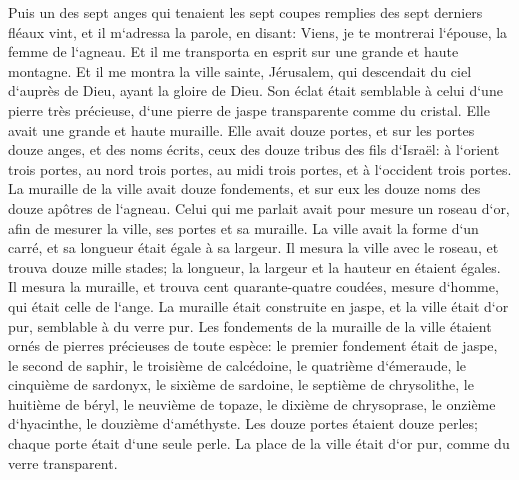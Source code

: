 \verse Puis un des sept anges qui tenaient les sept coupes remplies des sept derniers fléaux vint, et il m`adressa la parole, en disant: Viens, je te montrerai l`épouse, la femme de l`agneau. 
\verse Et il me transporta en esprit sur une grande et haute montagne. Et il me montra la ville sainte, Jérusalem, qui descendait du ciel d`auprès de Dieu, ayant la gloire de Dieu. 
\verse Son éclat était semblable à celui d`une pierre très précieuse, d`une pierre de jaspe transparente comme du cristal. 
\verse Elle avait une grande et haute muraille. Elle avait douze portes, et sur les portes douze anges, et des noms écrits, ceux des douze tribus des fils d`Israël: 
\verse à l`orient trois portes, au nord trois portes, au midi trois portes, et à l`occident trois portes. 
\verse La muraille de la ville avait douze fondements, et sur eux les douze noms des douze apôtres de l`agneau. 
\verse Celui qui me parlait avait pour mesure un roseau d`or, afin de mesurer la ville, ses portes et sa muraille. 
\verse La ville avait la forme d`un carré, et sa longueur était égale à sa largeur. Il mesura la ville avec le roseau, et trouva douze mille stades; la longueur, la largeur et la hauteur en étaient égales. 
\verse Il mesura la muraille, et trouva cent quarante-quatre coudées, mesure d`homme, qui était celle de l`ange. 
\verse La muraille était construite en jaspe, et la ville était d`or pur, semblable à du verre pur. 
\verse Les fondements de la muraille de la ville étaient ornés de pierres précieuses de toute espèce: le premier fondement était de jaspe, le second de saphir, le troisième de calcédoine, le quatrième d`émeraude, 
\verse le cinquième de sardonyx, le sixième de sardoine, le septième de chrysolithe, le huitième de béryl, le neuvième de topaze, le dixième de chrysoprase, le onzième d`hyacinthe, le douzième d`améthyste. 
\verse Les douze portes étaient douze perles; chaque porte était d`une seule perle. La place de la ville était d`or pur, comme du verre transparent. 
